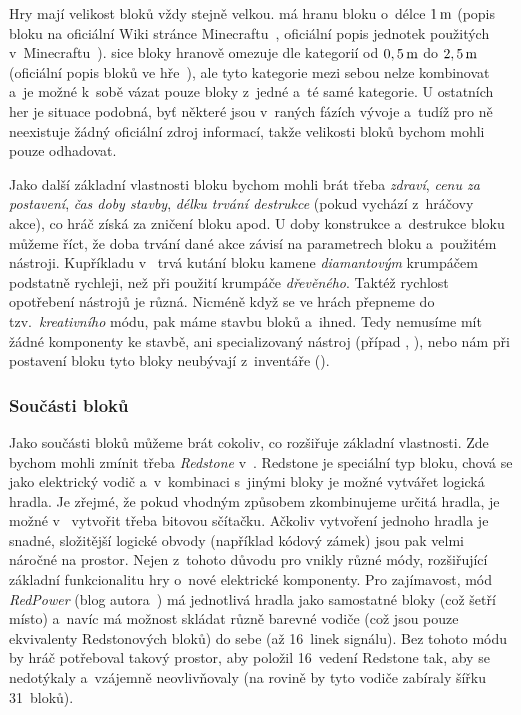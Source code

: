 Hry mají velikost bloků vždy stejně velkou. \MC{} má hranu bloku o~délce $1\,\rm m$ (popis bloku na oficiální Wiki stránce Minecraftu~\citep{mc_block}, oficiální popis jednotek použitých v~Minecraftu~\citep{mc_units}). \SE{} sice bloky hranově omezuje dle kategorií od $0,5\,\rm m$ do $2,5\,\rm m$ (oficiální popis bloků ve hře~\citep{se_blocks_wiki}), ale tyto kategorie mezi sebou nelze kombinovat a~je možné k~sobě vázat pouze bloky z~jedné a~té samé kategorie. U ostatních her je situace podobná, byť některé jsou v~raných fázích vývoje a~tudíž pro ně neexistuje žádný oficiální zdroj informací, takže velikosti bloků bychom mohli pouze odhadovat. 

Jako další základní vlastnosti bloku bychom mohli brát třeba \textit{zdraví}, \textit{cenu za postavení}, \textit{čas doby stavby}, \textit{délku trvání destrukce} (pokud vychází z~hráčovy akce), co hráč získá za zničení bloku apod. U doby konstrukce a~destrukce bloku můžeme říct, že doba trvání dané akce závisí na parametrech bloku a~použitém nástroji. Kupříkladu v~ trvá kutání bloku kamene \textit{diamantovým} krumpáčem podstatně rychleji, než při použití krumpáče \textit{dřevěného}. Taktéž rychlost opotřebení nástrojů je různá. Nicméně když se ve hrách přepneme do tzv.~\textit{kreativního} módu, pak máme stavbu bloků  a~ihned. Tedy nemusíme mít žádné komponenty ke stavbě, ani specializovaný nástroj (případ \SE{}, \ME{}), nebo nám při postavení bloku tyto bloky neubývají z~inventáře (\MC{}). 

\subsubsection{Součásti bloků}
Jako součásti bloků můžeme brát cokoliv, co rozšiřuje základní vlastnosti. Zde bychom mohli zmínit třeba \textit{Redstone} v~. Redstone je speciální typ bloku, chová se jako elektrický vodič a~v~kombinaci s~jinými bloky je možné vytvářet logická hradla. Je zřejmé, že pokud vhodným způsobem zkombinujeme určitá hradla, je možné v~ vytvořit třeba bitovou sčítačku. Ačkoliv vytvoření jednoho hradla je snadné, složitější logické obvody (například kódový zámek) jsou pak velmi náročné na prostor. Nejen z~tohoto důvodu pro \MC{} vnikly různé módy, rozšiřující základní funkcionalitu hry o~nové elektrické komponenty. Pro zajímavost, mód \textit{RedPower} (blog autora~\citep{eloraam}) má jednotlivá hradla jako samostatné bloky (což šetří místo) a~navíc má možnost skládat různě barevné vodiče (což jsou pouze ekvivalenty Redstonových bloků) do sebe (až 16~linek signálu). Bez tohoto módu by hráč potřeboval takový prostor, aby položil 16~vedení Redstone tak, aby se nedotýkaly a~vzájemně neovlivňovaly (na rovině by tyto vodiče zabíraly šířku 31~bloků). 

